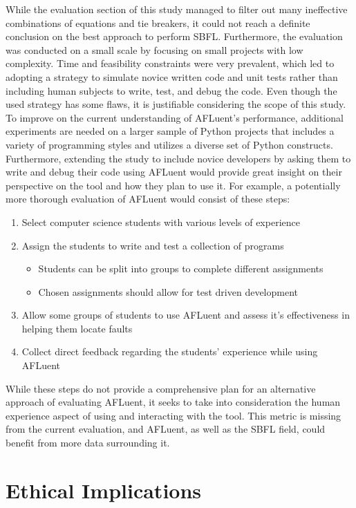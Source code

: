 While the evaluation section of this study managed to filter out many
ineffective combinations of equations and tie breakers, it could not reach a
definite conclusion on the best approach to perform SBFL. Furthermore, the
evaluation was conducted on a small scale by focusing on small projects with low
complexity. Time and feasibility constraints were very prevalent, which led to
adopting a strategy to simulate novice written code and unit tests rather than
including human subjects to write, test, and debug the code. Even though
the used strategy has some flaws, it is justifiable considering the scope of this
study. To improve on
the current understanding of AFLuent's performance,
additional experiments are needed on a larger sample of Python projects that
includes a variety of programming styles and utilizes a diverse set of Python
constructs. Furthermore, extending the
study to include novice developers by asking them to write and debug their code
using AFLuent would provide great insight on their perspective on the tool
and how they plan to use it. For example, a potentially more thorough evaluation of AFLuent
would consist of these steps:
\begin{enumerate}
    \item Select computer science students with various levels of experience
    \item Assign the students to write and test a collection of programs
    \begin{itemize}
        \item Students can be split into groups to complete different assignments
        \item Chosen assignments should allow for test driven development
    \end{itemize}
    \item Allow some groups of students to use AFLuent and assess it's
    effectiveness in helping them locate faults
    \item Collect direct feedback regarding the students' experience while using AFLuent
\end{enumerate}
While these steps do not provide a comprehensive plan for an alternative
approach of evaluating AFLuent, it seeks to take into consideration the human
experience aspect of using and interacting with the tool. This metric is missing
from the current evaluation, and AFLuent, as well as the SBFL field, could
benefit from more data surrounding it.

\section{Ethical Implications}

